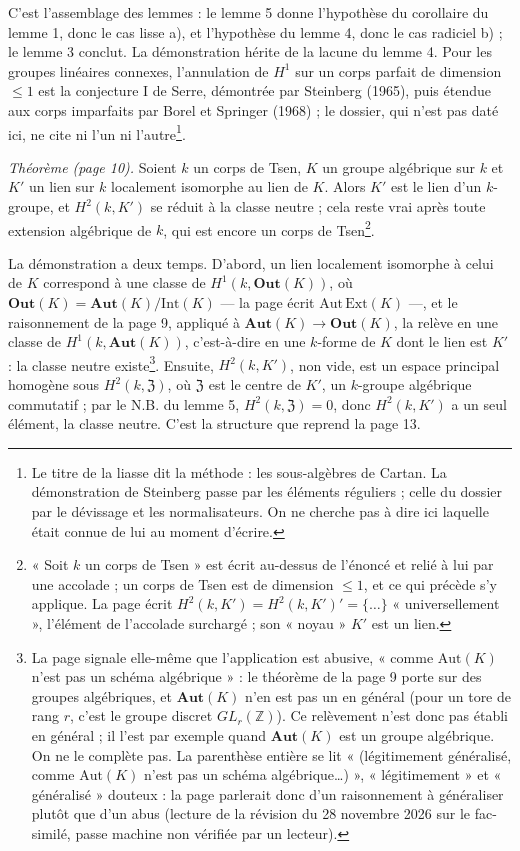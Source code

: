 \documentclass[11pt,a4paper]{article}
\begin{document}
C'est l'assemblage des lemmes : le lemme 5 donne l'hypothèse du corollaire du
lemme 1, donc le cas lisse a), et l'hypothèse du lemme 4, donc le cas
radiciel b) ; le lemme 3 conclut. La démonstration hérite de la lacune du lemme
4. Pour les groupes linéaires connexes, l'annulation de $H^1$ sur un corps
parfait de dimension $\leq 1$ est la conjecture I de Serre, démontrée par
Steinberg (1965), puis étendue aux corps imparfaits par Borel et Springer
(1968) ; le dossier, qui n'est pas daté ici, ne cite ni l'un ni
l'autre\footnote{Le titre de la liasse dit la méthode : les sous-algèbres de
Cartan. La démonstration de Steinberg passe par les éléments réguliers ; celle
du dossier par le dévissage et les normalisateurs. On ne cherche pas à dire ici
laquelle était connue de lui au moment d'écrire.}.

\emph{Théorème (page 10).} Soient $k$ un corps de Tsen, $K$ un groupe
algébrique sur $k$ et $K'$ un lien sur $k$ localement isomorphe au lien de $K$.
Alors $K'$ est le lien d'un $k$-groupe, et $H^2(k,K')$ se réduit à la classe
neutre ; cela reste vrai après toute extension algébrique de $k$, qui est encore
un corps de Tsen\footnote{« Soit $k$ un corps de Tsen » est écrit au-dessus de
l'énoncé et relié à lui par une accolade ; un corps de Tsen est de dimension
$\leq 1$, et ce qui précède s'y applique. La page écrit
$H^2(k,K') = H^2(k,K')' = \{\ldots\}$ « universellement », l'élément de
l'accolade surchargé ; son « noyau » $K'$ est un lien.}.

La démonstration a deux temps. D'abord, un lien localement isomorphe à celui de
$K$ correspond à une classe de $H^1(k,\mathbf{Out}(K))$, où
$\mathbf{Out}(K) = \mathbf{Aut}(K)/\mathrm{Int}(K)$ — la page écrit
$\mathrm{Aut\,Ext}(K)$ —, et le raisonnement de la page 9, appliqué à
$\mathbf{Aut}(K) \to \mathbf{Out}(K)$, la relève en une classe de
$H^1(k,\mathbf{Aut}(K))$, c'est-à-dire en une $k$-forme de $K$ dont le lien est
$K'$ : la classe neutre existe\footnote{La page signale elle-même que
l'application est abusive, « comme $\mathrm{Aut}(K)$ n'est pas un schéma
algébrique » : le théorème de la page 9 porte sur des groupes algébriques, et
$\mathbf{Aut}(K)$ n'en est pas un en général (pour un tore de rang $r$, c'est le
groupe discret $GL_r(\mathbb{Z})$). Ce relèvement n'est donc pas établi en
général ; il l'est par exemple quand $\mathbf{Aut}(K)$ est un groupe algébrique.
On ne le complète pas. La parenthèse entière se lit « (légitimement généralisé,
comme $\mathrm{Aut}(K)$ n'est pas un schéma algébrique…) », « légitimement » et
« généralisé » douteux : la page parlerait donc d'un raisonnement à
généraliser plutôt que d'un abus (lecture de la révision du 28 novembre 2026
sur le fac-similé, passe machine non vérifiée par un lecteur).}. Ensuite, $H^2(k,K')$, non vide, est un espace principal
homogène sous $H^2(k,\mathfrak{Z})$, où $\mathfrak{Z}$ est le centre de $K'$, un
$k$-groupe algébrique commutatif ; par le N.B. du lemme 5,
$H^2(k,\mathfrak{Z}) = 0$, donc $H^2(k,K')$ a un seul élément, la classe neutre.
C'est la structure que reprend la page 13.
\end{document}
